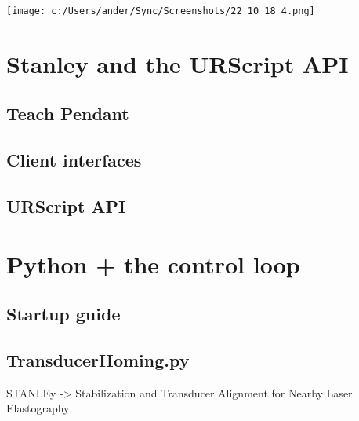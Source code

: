 \documentclass[11pt]{article}
\begin{document}
\begin{center}
    \texttt{[image: c:/Users/ander/Sync/Screenshots/22\_10\_18\_4.png]}
\end{center}

\section{Stanley and the URScript API}\label{sec:robot_summary}

\subsection{Teach Pendant}\label{sec:pendant}
\subsection{Client interfaces}\label{sec:robot_interfaces}
\subsection{URScript API}\label{sec:urscript}

\section{Python + the control loop}\label{sec:control_code}
\subsection{Startup guide}\label{sec:startup}
\subsection{TransducerHoming.py}\label{sec:TransducerHoming}

STANLEy -> Stabilization and Transducer Alignment for Nearby Laser Elastography
\end{document}
